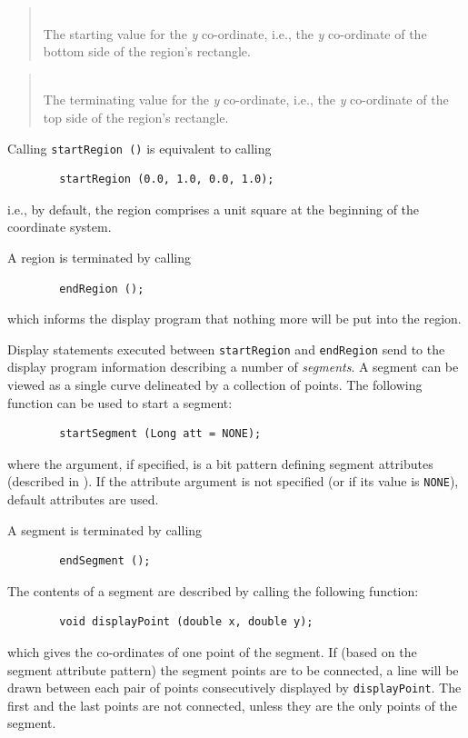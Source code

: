 \begin{quote}
\noindent{}\\ \hspace{0in}
The starting value for the {\em y\/} co-ordinate, i.e., the {\em y\/} co-ordinate of the
bottom side of the region's rectangle.
\end{quote}

\begin{quote}
\noindent{}\\ \hspace{0in}
The terminating value for the {\em y\/} co-ordinate, i.e., the {\em y\/} co-ordinate of the
top side of the region's rectangle.
\end{quote}\medskip

Calling {\tt startRegion~()} is equivalent to calling
\begin{verbatim}
        startRegion (0.0, 1.0, 0.0, 1.0);
\end{verbatim}
i.e., by default,
the region comprises a unit square at the beginning of the coordinate
system.

A region is terminated by calling
\begin{verbatim}
        endRegion ();
\end{verbatim}
which informs the display program that nothing more will be put into
the region.

Display statements executed between {\tt startRegion} and {\tt endRegion}
send to the display program information describing a number of
{\em segments}.
A segment can be viewed as a single curve delineated by a collection
of points.
The following function can be used to start a segment:
\begin{verbatim}
        startSegment (Long att = NONE);
\end{verbatim}
where the argument, if specified, is a bit pattern defining segment attributes
(described in ).
If the attribute argument is not specified (or if its value is {\tt NONE}),
default attributes are used.

A segment is terminated by calling
\begin{verbatim}
        endSegment ();
\end{verbatim}

The contents of a segment are described by calling the following function:
\begin{verbatim}
        void displayPoint (double x, double y);
\end{verbatim}
which gives the co-ordinates of one point of the segment.
If (based on the segment attribute pattern)
the segment points are to be connected, a line will be drawn between each
pair of points consecutively displayed by {\tt displayPoint}.
The first and the last points are not connected,
unless they are the only points of the segment.

